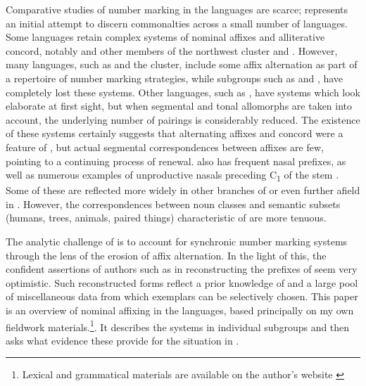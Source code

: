 \documentclass[output=paper]{langsci/langscibook}
\begin{document}
Comparative studies of number marking in the  languages are scarce; \citet{Bouquiaux1967} represents an initial attempt to discern commonalties across a small number of languages. 
Some  languages retain complex systems of nominal affixes and alliterative concord, notably  and other members of the northwest cluster and . However, many languages, such as  and the  cluster, include some affix alternation as part of a repertoire of number marking strategies, while subgroups such as  and , have completely lost these systems. Other languages, such as , have systems which look elaborate at first sight, but when segmental and tonal allomorphs are taken into account, the underlying number of pairings is considerably reduced. The existence of these systems certainly suggests that alternating affixes and concord were a feature of , but actual segmental correspondences between affixes are few, pointing to a continuing process of renewal.  also has frequent nasal prefixes, as well as numerous examples of unproductive nasals preceding C\textsubscript{1} of the stem \citep{Miehe1991}. Some of these are reflected more widely in other branches of  or even further afield in . However, the correspondences between noun classes and semantic subsets (humans, trees, animals, paired things) characteristic of  are more tenuous.

The analytic challenge of  is to account for synchronic number marking systems through the lens of the erosion of affix alternation. In the light of this, the confident assertions of authors such as  \citet{deWolf1971} in reconstructing the prefixes of  seem very optimistic. Such reconstructed forms reflect a prior knowledge of  and a large pool of miscellaneous data from which exemplars can be selectively chosen. This paper is an overview of nominal affixing in the  languages, based principally on my own fieldwork materials.\footnote{Lexical and grammatical materials are available on the author’s website \citet{Blenchn.d.b}}. It describes the systems in individual subgroups and then asks what evidence these provide for the situation in .
\end{document}
